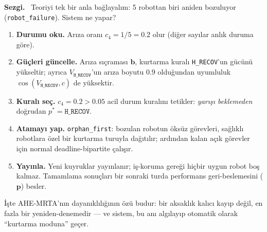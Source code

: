 \documentclass[11pt,a4paper]{article}
\newenvironment{sezgi}
  {\begin{lrbox}{\sezgibox}%
   \begin{minipage}{\dimexpr\linewidth-2\fboxsep-2\fboxrule\relax}%
   \small\textbf{\color{blue!55!black}Sezgi.}~}
  {\end{minipage}\end{lrbox}%
   \par\smallskip\noindent
   \fcolorbox{blue!45!black}{blue!5}{\usebox{\sezgibox}}%
   \par\smallskip}
\newcommand{\Hrecov}{\texttt{H\_RECOV}}
\begin{document}
\begin{sezgi}
Teoriyi tek bir anla bağlayalım: 5 robottan biri aniden bozuluyor
(\texttt{robot\_failure}). Sistem ne yapar?
\end{sezgi}

\begin{enumerate}
  \item \textbf{Durumu oku.} Arıza oranı $c_4=1/5=0.2$ olur (diğer sayılar
        anlık duruma göre).
  \item \textbf{Güçleri güncelle.} Arıza sıçraması $\mathbf{b}$, kurtarma
        kuralı \Hrecov'un gücünü yükseltir; ayrıca $V_{\Hrecov}$'un arıza
        boyutu $0.9$ olduğundan uyumluluk $\cos(V_{\Hrecov},c)$ de yüksektir.
  \item \textbf{Kuralı seç.} $c_4=0.2>0.05$ acil durum kuralını tetikler:
        \emph{yarışı beklemeden} doğrudan $p^\ast=\Hrecov$.
  \item \textbf{Atamayı yap.} \texttt{orphan\_first}: bozulan robotun öksüz
        görevleri, sağlıklı robotlara özel bir kurtarma turuyla dağıtılır;
        ardından kalan açık görevler için normal deadline-bipartite çalışır.
  \item \textbf{Yayınla.} Yeni kuyruklar yayınlanır; iş-koruma gereği hiçbir
        uygun robot boş kalmaz. Tamamlama sonuçları bir sonraki turda
        performans geri-beslemesini ($\mathbf{p}$) besler.
\end{enumerate}

İşte AHE-MRTA'nın dayanıklılığının özü budur: bir aksaklık kalıcı kayıp değil,
en fazla bir yeniden-denemedir --- ve sistem, bu anı algılayıp otomatik olarak
``kurtarma moduna'' geçer.
\end{document}
